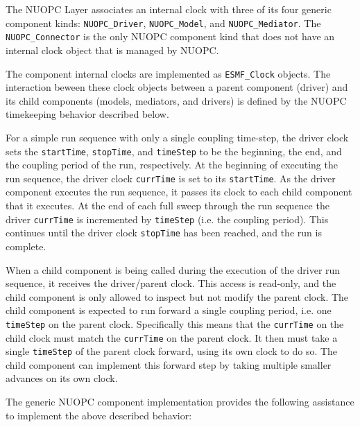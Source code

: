 %

\label{Timekeeping}

The NUOPC Layer associates an internal clock with three of its four generic component kinds: {\tt NUOPC\_Driver}, {\tt NUOPC\_Model}, and {\tt NUOPC\_Mediator}. The {\tt NUOPC\_Connector} is the only NUOPC component kind that does not have an internal clock object that is managed by NUOPC.

The component internal clocks are implemented as {\tt ESMF\_Clock} objects. The interaction beween these clock objects between a parent component (driver) and its child components (models, mediators, and drivers) is defined by the NUOPC timekeeping behavior described below.

For a simple run sequence with only a single coupling time-step, the driver clock sets the {\tt startTime}, {\tt stopTime}, and {\tt timeStep} to be the beginning, the end, and the coupling period of the run, respectively. At the beginning of executing the run sequence, the driver clock {\tt currTime} is set to its {\tt startTime}. As the driver component executes the run sequence, it passes its clock to each child component that it executes. At the end of each full sweep through the run sequence the driver {\tt currTime} is incremented by {\tt timeStep} (i.e. the coupling period). This continues until the driver clock {\tt stopTime} has been reached, and the run is complete.

When a child component is being called during the execution of the driver run sequence, it receives the driver/parent clock. This access is read-only, and the child component is only allowed to inspect but not modify the parent clock. The child component is expected to run forward a single coupling period, i.e. one {\tt timeStep} on the parent clock. Specifically this means that the {\tt currTime} on the child clock must match the {\tt currTime} on the parent clock. It then must take a single {\tt timeStep} of the parent clock forward, using its own clock to do so. The child component can implement this forward step by taking multiple smaller advances on its own clock. 

The generic NUOPC component implementation provides the following assistance to implement the above described behavior:

